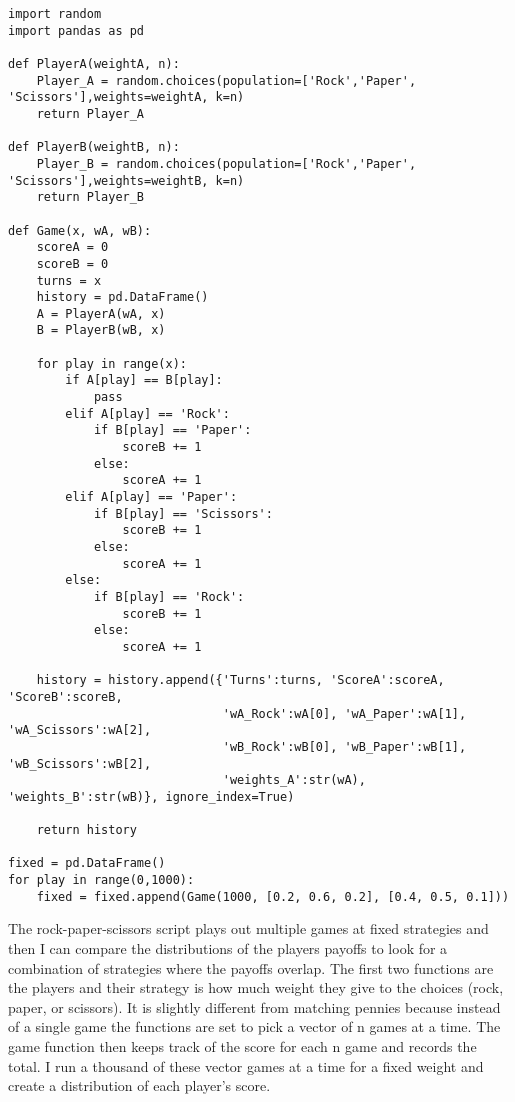 \begin{lstlisting}
import random
import pandas as pd

def PlayerA(weightA, n):
    Player_A = random.choices(population=['Rock','Paper', 'Scissors'],weights=weightA, k=n)
    return Player_A
    
def PlayerB(weightB, n):
    Player_B = random.choices(population=['Rock','Paper', 'Scissors'],weights=weightB, k=n)
    return Player_B

def Game(x, wA, wB):
    scoreA = 0
    scoreB = 0
    turns = x
    history = pd.DataFrame() 
    A = PlayerA(wA, x)
    B = PlayerB(wB, x)
    
    for play in range(x):
        if A[play] == B[play]:
            pass
        elif A[play] == 'Rock':
            if B[play] == 'Paper':
                scoreB += 1
            else:
                scoreA += 1    
        elif A[play] == 'Paper':
            if B[play] == 'Scissors':
                scoreB += 1
            else:
                scoreA += 1
        else:
            if B[play] == 'Rock':
                scoreB += 1
            else:
                scoreA += 1
            
    history = history.append({'Turns':turns, 'ScoreA':scoreA, 'ScoreB':scoreB,
                              'wA_Rock':wA[0], 'wA_Paper':wA[1], 'wA_Scissors':wA[2],
                              'wB_Rock':wB[0], 'wB_Paper':wB[1], 'wB_Scissors':wB[2],
                              'weights_A':str(wA), 'weights_B':str(wB)}, ignore_index=True)
                    
    return history

fixed = pd.DataFrame()
for play in range(0,1000):
    fixed = fixed.append(Game(1000, [0.2, 0.6, 0.2], [0.4, 0.5, 0.1]))
\end{lstlisting}

The rock-paper-scissors script plays out multiple games at fixed strategies and then I can compare the distributions of the players payoffs to look for a combination of strategies where the payoffs overlap. The first two functions are the players and their strategy is how much weight they give to the choices (rock, paper, or scissors). It is slightly different from matching pennies because instead of a single game the functions are set to pick a vector of n games at a time. The game function then keeps track of the score for each n game and records the total. I run a thousand of these vector games at a time for a fixed weight and create a distribution of each player's score. 

